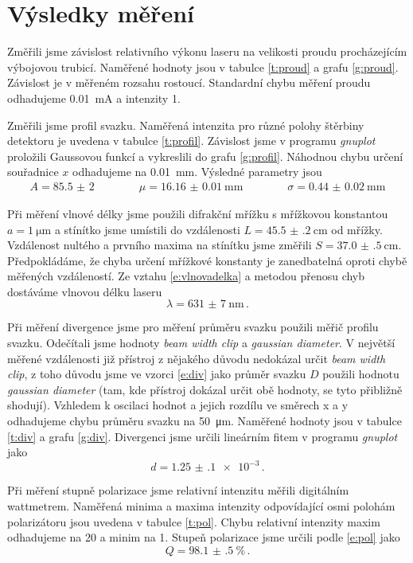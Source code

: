 \section*{Výsledky měření}

Změřili jsme závislost relativního výkonu laseru na velikosti proudu procházejícím výbojovou trubicí. Naměřené hodnoty jsou v tabulce \ref{t:proud} a grafu \ref{g:proud}. Závislost je v měřeném rozsahu rostoucí. Standardní chybu měření proudu odhadujeme \SI{0.01}{\mA} a intenzity \num{1}.


Změřili jsme profil svazku. Naměřená intenzita pro různé polohy štěrbiny detektoru je uvedena v tabulce \ref{t:profil}. Závislost jsme v programu \emph{gnuplot} proložili Gaussovou funkcí a vykreslili do grafu \ref{g:profil}. Náhodnou chybu určení souřadnice $x$ odhadujeme na \SI{0.01}{\mm}. Výsledné parametry jsou
\begin{equation*}
\begin{array}{ccc}
A=\num{85.5(20)} \qquad \qquad \mu = \SI{16.16(1)}{\mm} \qquad \qquad \sigma = \SI{0.44(2)}{\mm}
\end{array}
\end{equation*}

Při měření vlnové délky jsme použili difrakční mřížku s mřížkovou konstantou $a=\SI{1}{\micro\metre}$ a stínítko jsme umístili do vzdálenosti $L=\SI{45.5(2)}{\cm}$ od mřížky.
 Vzdálenost nultého a prvního maxima na stínítku jsme změřili $S=\SI{37.0(5)}{\cm}$.
Předpokládáme, že chyba určení mřížkové konstanty je zanedbatelná oproti chybě měřených vzdáleností. Ze vztahu \eqref{e:vlnovadelka} a metodou přenosu chyb dostáváme vlnovou délku laseru 
\begin{equation*}
\lambda=\SI{631(7)}{\nm} \,.
\end{equation*}

Při měření divergence jsme pro měření průměru svazku použili měřič profilu svazku. Odečítali jsme hodnoty \emph{beam width clip} a \emph{gaussian diameter}. V největší měřené vzdálenosti již přístroj z nějakého důvodu nedokázal určit \emph{beam width clip}, z toho důvodu jsme ve vzorci \eqref{e:div} jako průměr svazku $D$ použili hodnotu \emph{gaussian diameter} (tam, kde přístroj dokázal určit obě hodnoty, se tyto přibližně shodují). Vzhledem k oscilaci hodnot a jejich rozdílu ve směrech x a y odhadujeme chybu průměru svazku na \SI{50}{\micro\metre}.
Naměřené hodnoty jsou v tabulce \ref{t:div} a grafu \ref{g:div}. Divergenci jsme určili lineárním fitem v programu \emph{gnuplot} jako 
\begin{equation*}
d=\num{1.25(10)e-3} \,.
\end{equation*}

Při měření stupně polarizace jsme relativní intenzitu měřili digitálním wattmetrem. Naměřená minima a maxima intenzity odpovídající osmi polohám polarizátoru jsou uvedena v tabulce \ref{t:pol}. Chybu relativní intenzity maxim odhadujeme na \num{20} a minim na \num{1}. Stupeň polarizace jsme určili podle \eqref{e:pol} jako
\begin{equation*}
Q=\SI{98.1(5)}{\percent} \,.
\end{equation*}


